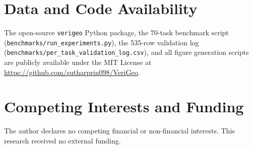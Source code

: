 \documentclass[10pt,twocolumn]{article}
\begin{document}
\section*{Data and Code Availability}
The open-source \texttt{verigeo} Python package, the 70-task benchmark script (\texttt{benchmarks/\allowbreak run\_experiments.py}), the 535-row validation log (\texttt{benchmarks/\allowbreak per\_task\_\allowbreak validation\_log.csv}), and all figure generation scripts are publicly available under the MIT License at \url{https://github.com/sutharprin098/VeriGeo}.

\section*{Competing Interests and Funding}
The author declares no competing financial or non-financial interests. This research received no external funding.



\end{document}
